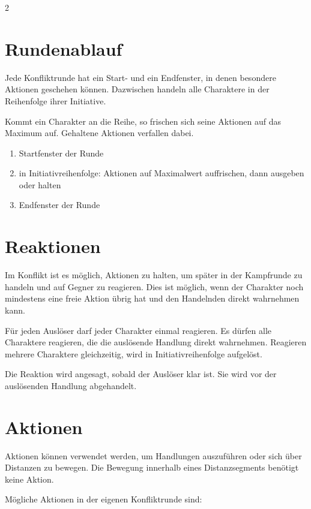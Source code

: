 \begin{multicols*}{2}
\section{Rundenablauf}\label{sec:rundenablauf}

Jede Konfliktrunde hat ein Start- und ein Endfenster, in denen besondere Aktionen geschehen können.
Dazwischen handeln alle Charaktere in der Reihenfolge ihrer Initiative.

Kommt ein Charakter an die Reihe, so frischen sich seine Aktionen auf das Maximum auf.
Gehaltene Aktionen verfallen dabei.

\begin{enumerate}[leftmargin=*]
\item Startfenster der Runde
\item in Initiativreihenfolge: Aktionen auf Maximalwert auffrischen, dann ausgeben oder halten
\item Endfenster der Runde
\end{enumerate}

\section{Reaktionen}\label{sec:reaktionen}

Im Konflikt ist es möglich, Aktionen zu halten, um später in der Kampfrunde zu handeln und auf Gegner zu reagieren.
Dies ist möglich, wenn der Charakter noch mindestens eine freie Aktion übrig hat und den Handelnden direkt wahrnehmen kann.

Für jeden Auslöser darf jeder Charakter einmal reagieren.
Es dürfen alle Charaktere reagieren, die die auslösende Handlung direkt wahrnehmen.
Reagieren mehrere Charaktere gleichzeitig, wird in Initiativreihenfolge aufgelöst.

Die Reaktion wird angesagt, sobald der Auslöser klar ist.
Sie wird vor der auslösenden Handlung abgehandelt.

\section{Aktionen}\label{sec:aktionsliste}

Aktionen können verwendet werden, um Handlungen auszuführen oder sich über Distanzen zu bewegen.
Die Bewegung innerhalb eines Distanzsegments benötigt keine Aktion.

Mögliche Aktionen in der eigenen Konfliktrunde sind:


\end{multicols*}
